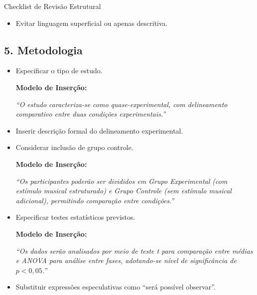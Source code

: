 \documentclass[11pt,a4paper]{article}
\begin{document}
\begin{boxAvisos}{Checklist de Revisão Estrutural}
\begin{itemize}
    \textbf{Modelo de Inserção:}
    
    \textit{``Diferentemente dos trabalhos analisados, esta proposta integra estímulos musicais estruturados, coleta automatizada de métricas atencionais e aplicação em ambiente educacional, configurando uma abordagem interdisciplinar entre tecnologia acessível e intervenção cognitiva.''}

    \item[$\Box$] Evitar linguagem superficial ou apenas descritiva.
\end{itemize}


\subsection*{5. Metodologia}

\begin{itemize}
    \item[$\boxtimes$] Especificar o tipo de estudo.
    
    \textbf{Modelo de Inserção:}
    
    \textit{``O estudo caracteriza-se como quase-experimental, com delineamento comparativo entre duas condições experimentais.''}

    \item[$\boxtimes$] Inserir descrição formal do delineamento experimental.
    
    \item[$\boxtimes$] Considerar inclusão de grupo controle.
    
    \textbf{Modelo de Inserção:}
    
    \textit{``Os participantes poderão ser divididos em Grupo Experimental (com estímulo musical estruturado) e Grupo Controle (sem estímulo musical adicional), permitindo comparação entre condições.''}

    \item[$\Box$] Especificar testes estatísticos previstos.
    
    \textbf{Modelo de Inserção:}
    
    \textit{``Os dados serão analisados por meio de teste t para comparação entre médias e ANOVA para análise entre fases, adotando-se nível de significância de $p < 0{,}05$.''}

    \item[$\boxtimes$] Substituir expressões especulativas como ``será possível observar''.
    

\end{itemize}
\end{boxAvisos}
\end{document}

